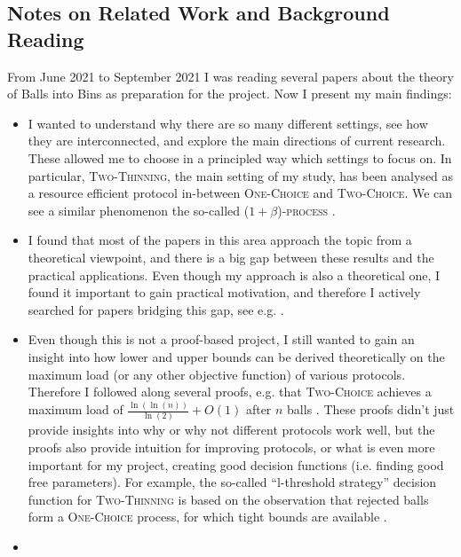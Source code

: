 \subsection{Notes on Related Work and Background Reading}


From June 2021 to September 2021 I was reading several papers about the theory of Balls into Bins as preparation for the project. Now I present my main findings: 


\begin{itemize}
    \item 
    I wanted to understand why there are so many different settings, see how they are interconnected, and explore the main directions of current research. These allowed me to choose in a principled way which settings to focus on. In particular, \textsc{Two-Thinning}, the main setting of my study, has been analysed as a resource efficient protocol in-between \textsc{One-Choice} and \textsc{Two-Choice}. We can see a similar phenomenon the so-called \textsc{($1+\beta$)-process} \cite{peres2015oneplusbeta}.
    \item
    I found that most of the papers in this area approach the topic from a theoretical viewpoint, and there is a big gap between these results and the practical applications. Even though my approach is also a theoretical one, I found it important to gain practical motivation, and therefore I actively searched for papers bridging this gap, see e.g. \cite{wang2017twochoicerouting}.
    \item
    Even though this is not a proof-based project, I still wanted to gain an insight into how lower and upper bounds can be derived theoretically on the maximum load (or any other objective function) of various protocols. Therefore I followed along several proofs, e.g. that \textsc{Two-Choice} achieves a maximum load of $\frac{\ln(\ln(n))}{\ln(2)} + O(1)$ after $n$ balls \cite{azar1999twochoice}. These proofs didn't just provide insights into why or why not different protocols work well, but the proofs also provide intuition for improving protocols, or what is even more important for my project, creating good decision functions (i.e. finding good free parameters). For example, the so-called ``l-threshold strategy'' decision function for \textsc{Two-Thinning} is based on the observation that rejected balls form a \textsc{One-Choice} process, for which tight bounds are available \cite{feldheim2021thinning}.
    \item

\end{itemize}
